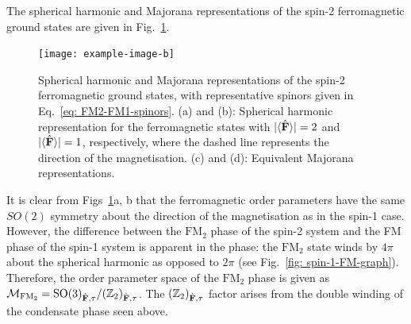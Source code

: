 The spherical harmonic and Majorana representations of the spin-2 ferromagnetic
ground states are given in Fig.~\ref{fig: spin-2-FM-graph}.
\begin{figure}
    \centering
    \texttt{[image: example-image-b]}
    \caption{\label{fig: spin-2-FM-graph}Spherical harmonic and Majorana
    representations of the spin-2 ferromagnetic ground states, with
    representative spinors given in Eq.~\eqref{eq: FM2-FM1-spinors}.
    (a) and (b): Spherical harmonic representation for the ferromagnetic states
    with \(|\langle \hat{\vb{F}} \rangle |=2\) and \(|\langle \hat{\vb{F}} \rangle |=1\), respectively, where the dashed line
    represents the direction of the magnetisation.
    (c) and (d): Equivalent Majorana representations.}
\end{figure}
It is clear from Figs~\ref{fig: spin-2-FM-graph}a, b that the ferromagnetic
order parameters have the same \(SO(2)\) symmetry about the direction of the
magnetisation as in the spin-1 case.
However, the difference between the \(\text{FM}_2\) phase of the spin-2 system
and the FM phase of the spin-1 system is apparent in the phase: the
\(\text{FM}_2\) state winds by \(4\pi \) about the spherical harmonic as opposed
to \(2\pi \) (see Fig.~\ref{fig: spin-1-FM-graph}).
Therefore, the order parameter space of the \(\text{FM}_2\) phase is given as
\(\mathcal{M}_{\text{FM}_2} = {\text{SO}(3)}_{\hat{\vb{F}}, \tau} /
{(\mathbb{Z}_2)}_{\hat{\vb{F}}, \tau}\).
The \({(\mathbb{Z}_2)}_{\hat{\vb{F}}, \tau}\) factor arises from the double
winding of the condensate phase seen above.

